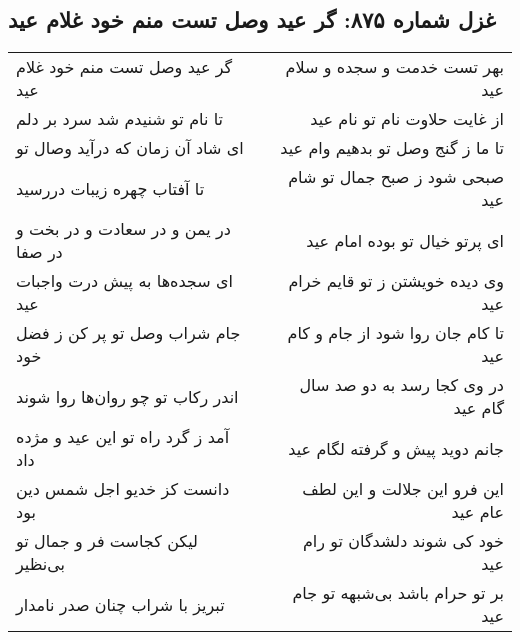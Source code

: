 \begin{center}
\section*{غزل شماره ۸۷۵: گر عید وصل تست منم خود غلام عید}
\label{sec:0875}
\begin{longtable}{l p{0.5cm} r}
گر عید وصل تست منم خود غلام عید
&&
بهر تست خدمت و سجده و سلام عید
\\
تا نام تو شنیدم شد سرد بر دلم
&&
از غایت حلاوت نام تو نام عید
\\
ای شاد آن زمان که درآید وصال تو
&&
تا ما ز گنج وصل تو بدهیم وام عید
\\
تا آفتاب چهره زیبات دررسید
&&
صبحی شود ز صبح جمال تو شام عید
\\
در یمن و در سعادت و در بخت و در صفا
&&
ای پرتو خیال تو بوده امام عید
\\
ای سجده‌ها به پیش درت واجبات عید
&&
وی دیده خویشتن ز تو قایم خرام عید
\\
جام شراب وصل تو پر کن ز فضل خود
&&
تا کام جان روا شود از جام و کام عید
\\
اندر رکاب تو چو روان‌ها روا شوند
&&
در وی کجا رسد به دو صد سال گام عید
\\
آمد ز گرد راه تو این عید و مژده داد
&&
جانم دوید پیش و گرفته لگام عید
\\
دانست کز خدیو اجل شمس دین بود
&&
این فرو این جلالت و این لطف عام عید
\\
لیکن کجاست فر و جمال تو بی‌نظیر
&&
خود کی شوند دلشدگان تو رام عید
\\
تبریز با شراب چنان صدر نامدار
&&
بر تو حرام باشد بی‌شبهه تو جام عید
\\
\end{longtable}
\end{center}
